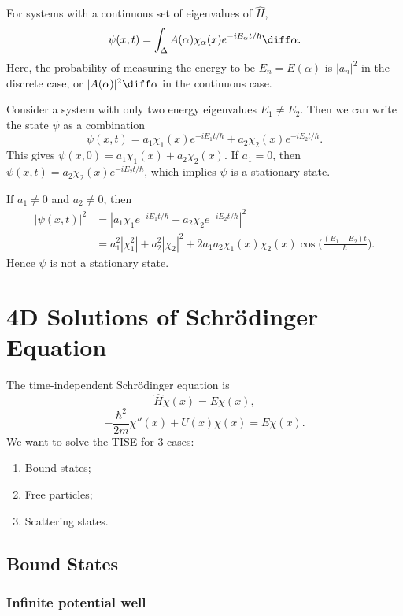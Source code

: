 \documentclass[12pt]{article}
\begin{document}
For systems with a continuous set of eigenvalues of $\hat H$,
\[
	\psi(x, t) = \int_{\Delta}A(\alpha)\chi_{\alpha}(x) e^{-iE_{\alpha}t/\hbar} \diff \alpha
.\]
Here, the probability of measuring the energy to be $E_n = E(\alpha)$ is $|a_n|^2$ in the discrete case, or $|A(\alpha)|^2 \diff \alpha$ in the continuous case.

Consider a system with only two energy eigenvalues $E_1 \neq E_2$. Then we can write the state $\psi$ as a combination
\[
	\psi(x, t) = a_1 \chi_1(x) e^{-i E_1 t/\hbar} + a_2 \chi_2(x) e^{-i E_2 t/\hbar}
.\]
This gives $\psi(x, 0) = a_1 \chi_1(x) + a_2 \chi_2(x)$. If $a_1 = 0$, then $\psi(x, t) = a_2 \chi_2(x) e^{-i E_2 t/\hbar}$, which implies $\psi$ is a stationary state.

If $a_1 \neq 0$ and $a_2 \neq 0$, then
\begin{align*}
	|\psi(x, t)|^2 &= |a_1 \chi_1 e^{-iE_1 t/\hbar} + a_2 \chi_2 e^{-iE_2 t/\hbar}|^2 \\
		       &= a_1^2|\chi_1^2| + a_2^2|\chi_2|^2 + 2a_1a_2 \chi_1(x)\chi_2(x) \cos \biggl( \frac{(E_1 - E_2)t}{\hbar} \biggr).
\end{align*}
Hence $\psi$ is not a stationary state.
\newpage

\section[4D Solutions]{4D Solutions of Schr\"{o}dinger Equation}%
\label{sec:4d_solutions_of_schr"_o_dinger_equation}

The time-independent Schr\"{o}dinger equation is
\[
	\hat H \chi(x) = E \chi(x)
,\]
\[
	- \frac{\hbar^2}{2m}\chi''(x) + U(x) \chi(x) = E \chi(x)
.\]
We want to solve the TISE for 3 cases:
\begin{enumerate}[1.]
	\item Bound states;
	\item Free particles;
	\item Scattering states.
\end{enumerate}

\subsection{Bound States}%
\label{sub:bound_states}

\subsubsection{Infinite potential well}%
\label{subsub:infinite_potential_well}
\end{document}
